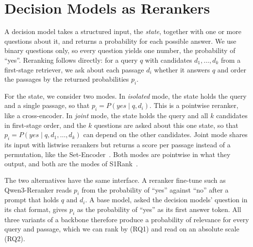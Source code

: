 \section{Decision Models as Rerankers}
\label{sec:decision-models}

A decision model takes a structured input, the \emph{state}, together with one or more questions about it, and
returns a probability for each possible answer. We use binary questions only, so every question yields one number,
the probability of ``yes''. Reranking follows directly: for a query $q$ with candidates $d_1, \dots, d_k$ from a
first-stage retriever, we ask about each passage $d_i$ whether it answers $q$ and order the passages by the returned
probabilities $p_i$.

For the state, we consider two modes. In \emph{isolated} mode, the state holds the query and a single passage, so that
$p_i = P(\textit{yes} \mid q, d_i)$. This is a pointwise reranker, like a cross-encoder. In \emph{joint} mode, the
state holds the query and all $k$ candidates in first-stage order, and the $k$ questions are asked about this one
state, so that $p_i = P(\textit{yes} \mid q, d_1, \dots, d_k)$ can depend on the other candidates. Joint mode shares
its input with listwise rerankers but returns a score per passage instead of a permutation, like the
Set-Encoder~\cite{Schlatt2025SetEncoder}. Both modes are pointwise in what they output, and both are the modes of
S1Rank~\cite{S1Rank}.

The two alternatives have the same interface. A reranker fine-tune such as Qwen3-Reranker reads $p_i$ from the
probability of ``yes'' against ``no'' after a prompt that holds $q$ and $d_i$. A base model, asked the decision
models' question in its chat format, gives $p_i$ as the probability of ``yes'' as its first answer token. All three
variants of a backbone therefore produce a probability of relevance for every query and passage, which we can rank by
(RQ1) and read on an absolute scale (RQ2).
